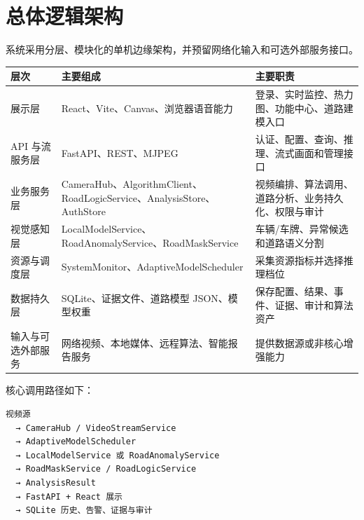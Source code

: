 \section{总体逻辑架构}\label{design-ux603bux4f53ux903bux8f91ux67b6ux6784}

系统采用分层、模块化的单机边缘架构，并预留网络化输入和可选外部服务接口。

\begin{longtable}[]{@{}
  >{\raggedright\arraybackslash}p{}
  >{\raggedright\arraybackslash}p{}
  >{\raggedright\arraybackslash}p{}@{}}
\toprule\noalign{}
\begin{minipage}[b]{\linewidth}\raggedright
层次
\end{minipage} & \begin{minipage}[b]{\linewidth}\raggedright
主要组成
\end{minipage} & \begin{minipage}[b]{\linewidth}\raggedright
主要职责
\end{minipage} \\
\midrule\noalign{}
\endhead
\bottomrule\noalign{}
\endlastfoot
展示层 & React、Vite、Canvas、浏览器语音能力 & 登录、实时监控、热力图、功能中心、道路建模入口 \\
API 与流服务层 & FastAPI、REST、MJPEG & 认证、配置、查询、推理、流式画面和管理接口 \\
业务服务层 & CameraHub、AlgorithmClient、RoadLogicService、AnalysisStore、AuthStore & 视频编排、算法调用、道路分析、业务持久化、权限与审计 \\
视觉感知层 & LocalModelService、RoadAnomalyService、RoadMaskService & 车辆/车牌、异常候选和道路语义分割 \\
资源与调度层 & SystemMonitor、AdaptiveModelScheduler & 采集资源指标并选择推理档位 \\
数据持久层 & SQLite、证据文件、道路模型 JSON、模型权重 & 保存配置、结果、事件、证据、审计和算法资产 \\
输入与可选外部服务 & 网络视频、本地媒体、远程算法、智能报告服务 & 提供数据源或非核心增强能力 \\
\end{longtable}

核心调用路径如下：

\begin{Verbatim}[breaklines=true,breakanywhere=true,fontsize=\small,frame=single,framesep=2mm,rulecolor=\color{STransLine}]
视频源
  → CameraHub / VideoStreamService
  → AdaptiveModelScheduler
  → LocalModelService 或 RoadAnomalyService
  → RoadMaskService / RoadLogicService
  → AnalysisResult
  → FastAPI + React 展示
  → SQLite 历史、告警、证据与审计
\end{Verbatim}

